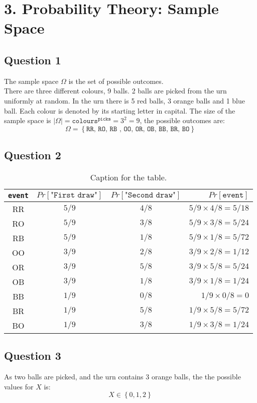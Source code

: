 \documentclass{article}
\begin{document}
\section{3. Probability Theory: Sample Space}
\subsection{Question 1}
The sample space $\Omega$ is the set of possible outcomes. \\
There are three different colours, 9 balls. 2  balls are picked from the urn uniformly at random. In the urn there is 5 red balls, 3 orange balls and 1 blue ball. Each colour is denoted by its starting letter in capital. The size of the sample space is $|\Omega| = \texttt{colours}^{\texttt{picks}} = 3^2 = 9$, the possible outcomes are:
$$ \Omega = \left\lbrace \texttt{RR, RO, RB , OO, OR, OB, BB, BR, BO} \right\rbrace $$
\subsection{Question 2}
\begin{table}[H]
  \centering
  \caption{Caption for the table.}
  \label{tab:table1}
  \begin{tabular}{c|c|c||r}
    \texttt{event} & $Pr[\texttt{"First draw"}]$ & $Pr[\texttt{"Second draw"}]$ & $Pr[\texttt{event}]$ \\
    \hline
    RR & $5/9$ & $4/8$ &  $ 5/9 \times 4/8 = 5/18$\\
    RO & $5/9$ & $3/8$ &  $ 5/9 \times 3/8 = 5/24$\\
    RB & $5/9$ & $1/8$ &  $ 5/9 \times 1/8 = 5/72$\\
    OO & $3/9$ & $2/8$ &  $ 3/9 \times 2/8 = 1/12$\\
    OR & $3/9$ & $5/8$ &  $ 3/9 \times 5/8 = 5/24$\\
    OB & $3/9$ & $1/8$ &  $ 3/9 \times 1/8 = 1/24$\\
    BB & $1/9$ & $0/8$ &  $ 1/9 \times 0/8 = 0$\\
    BR & $1/9$ & $5/8$ &  $ 1/9 \times 5/8 = 5/72$\\
    BO & $1/9$ & $3/8$ &  $ 1/9 \times 3/8 = 1/24$\\
  \end{tabular}
\end{table}
\subsection{Question 3}
As two balls are picked, and the urn contains 3 orange balls, the the possible values for $X$ is:
$$ X \in \left\lbrace 0,1,2 \right\rbrace $$
\end{document}
